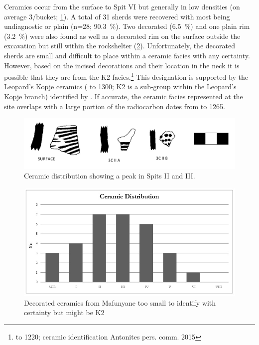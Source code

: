 Ceramics occur from the  surface to Spit VI but generally in low densities (on average 3/bucket; \cref{fig:Forssman-Figure07}). 
A total of 31 sherds were recovered with most being undiagnostic or plain 
(n=28; \SI{90.3}{\percent}). 
Two decorated (\SI{6.5}{\percent}) and one plain rim (\SI{3.2}{\percent}) were also found as well as a decorated rim on the surface outside the excavation but still within the rockshelter (\cref{fig:Forssman-Figure08}). 
Unfortunately, the decorated sherds are small and difficult to place within a ceramic facies with any certainty. However, based on the incised decorations and their location in the neck it is possible that they are from the K2 facies.\footnote{ to 1220; ceramic identification Antonites pers. comm. 2015} 
This designation is supported by the Leopard’s Kopje ceramics ( to 1300; K2 is a sub-group within the Leopard’s Kopje branch) identified by \textcite{Walker_1994}. 
If accurate, the ceramic facies represented at the site overlaps with a large portion of the radiocarbon dates from  to 1265.

	\begin{figure} %
		\includegraphics[width=\linewidth]{figures/Forssman-Figure07}
		\caption{Ceramic distribution showing a peak in Spits II and III.}
		\label{fig:Forssman-Figure07}
	\end{figure}
	
		\begin{figure} %
			\includegraphics[width=\linewidth]{figures/Forssman-Figure08}
			\caption{Decorated ceramics from Mafunyane too small to identify with certainty but might be K2}
			\label{fig:Forssman-Figure08}
		\end{figure}

